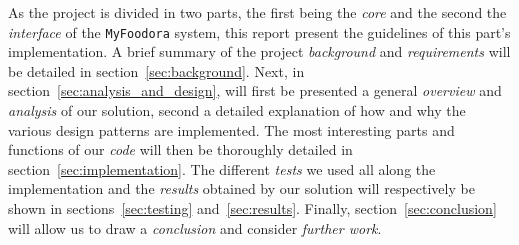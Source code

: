 As the project is divided in two parts, the first being the \emph{core}
and the second the \emph{interface} of the \lstinline|MyFoodora| system,
this report present the guidelines of this part's implementation.
A brief summary of the project \emph{background} and \emph{requirements} will
be detailed in section~\ref{sec:background}.
Next, in section~\ref{sec:analysis_and_design}, will first be presented
a general \emph{overview} and \emph{analysis} of our solution, second a detailed 
explanation of how and why the various design patterns are implemented.
The most interesting parts and functions of our \emph{code} will then be
thoroughly detailed in section~\ref{sec:implementation}.
The different \emph{tests} we used all along the implementation
and the \emph{results} obtained by our solution will respectively
be shown in sections~\ref{sec:testing} and~\ref{sec:results}.
Finally, section~\ref{sec:conclusion} will allow us to draw 
a \emph{conclusion} and consider \emph{further work}.

